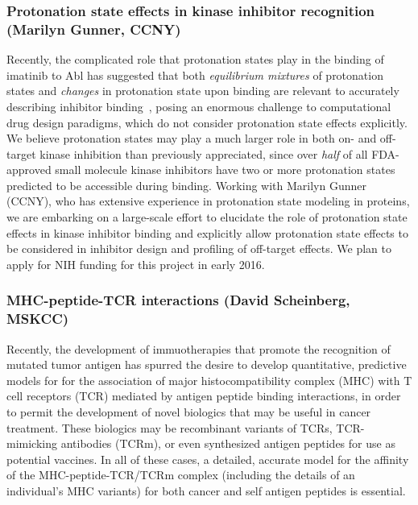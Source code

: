 \documentclass[10pt]{article}
\begin{document}
\vspace{-0.3cm}
\subsubsection*{Protonation state effects in kinase inhibitor recognition (Marilyn Gunner, CCNY)}
\vspace{-0.3cm}
Recently, the complicated role that protonation states play in the binding of imatinib to Abl has suggested that both \emph{equilibrium mixtures} of protonation states and \emph{changes} in protonation state upon binding are relevant to accurately describing inhibitor binding~\cite{szakacks:j-med-chem:2005:acid-base-profiling-of-imatinib,seeliger:2007:structure:imatinib-binding,roux:pnas:2013:gleevec-selectivity}, posing an enormous challenge to computational drug design paradigms, which do not consider protonation state effects explicitly.
We believe protonation states may play a much larger role in both on- and off-target kinase inhibition than previously appreciated, since over \emph{half} of all FDA-approved small molecule kinase inhibitors have two or more protonation states predicted to be accessible during binding.
Working with Marilyn Gunner (CCNY), who has extensive experience in protonation state modeling in proteins, we are embarking on a large-scale effort to elucidate the role of protonation state effects in kinase inhibitor binding and explicitly allow protonation state effects to be considered in inhibitor design and profiling of off-target effects.
We plan to apply for NIH funding for this project in early 2016.

\vspace{-0.3cm}
\subsubsection*{MHC-peptide-TCR interactions (David Scheinberg, MSKCC)}
\vspace{-0.3cm}

Recently, the development of immuotherapies that promote the recognition of mutated tumor antigen has spurred the desire to develop quantitative, predictive models for for the association of major histocompatibility complex (MHC) with T cell receptors (TCR) mediated by antigen peptide binding interactions, in order to permit the development of novel biologics that may be useful in cancer treatment.
These biologics may be recombinant variants of TCRs, TCR-mimicking antibodies (TCRm), or even synthesized antigen peptides for use as potential vaccines.
In all of these cases, a detailed, accurate model for the affinity of the MHC-peptide-TCR/TCRm complex (including the details of an individual's MHC variants) for both cancer and self antigen peptides is essential.
\end{document}
